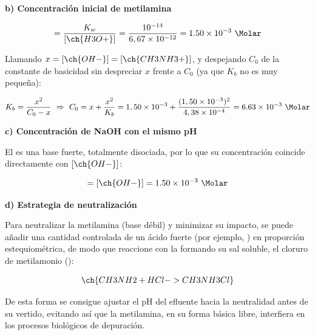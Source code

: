 \begin{exerciseEVAU}
\begin{solu}
    \textbf{b) Concentración inicial de metilamina}

    \begin{equation*}
        [\ch{OH-}] = \dfrac{K_w}{[\ch{H3O+}]} = \dfrac{10^{-14}}{6,67 \times 10^{-12}} = \num{1.50e-3} \ \si{\Molar}
    \end{equation*}

    Llamando \(x = [\ch{OH-}] = [\ch{CH3NH3+}]\), y despejando \(C_0\) de la constante de basicidad sin despreciar \(x\) frente a \(C_0\) (ya que \(K_b\) no es muy pequeña):

    \begin{equation*}
        K_b = \dfrac{x^2}{C_0-x} \ \Rightarrow \ C_0 = x + \dfrac{x^2}{K_b} = 1,50\times10^{-3} + \dfrac{(1,50\times10^{-3})^2}{4,38\times10^{-4}} = \num{6.63e-3} \ \si{\Molar}
    \end{equation*}

    \textbf{c) Concentración de NaOH con el mismo pH}

    El  es una base fuerte, totalmente disociada, por lo que su concentración coincide directamente con \([\ch{OH-}]\):

    \begin{equation*}
        [\ch{NaOH}] = [\ch{OH-}] = \num{1.50e-3} \ \si{\Molar}
    \end{equation*}

    \textbf{d) Estrategia de neutralización}

    Para neutralizar la metilamina (base débil) y minimizar su impacto, se puede añadir una cantidad controlada de un ácido fuerte (por ejemplo, ) en proporción estequiométrica, de modo que reaccione con la  formando su sal soluble, el cloruro de metilamonio ():

    \begin{equation*}
        \ch{CH3NH2 + HCl -> CH3NH3Cl}
    \end{equation*}

    De esta forma se consigue ajustar el pH del efluente hacia la neutralidad antes de su vertido, evitando así que la metilamina, en su forma básica libre, interfiera en los procesos biológicos de depuración.

\end{solu}

\end{exerciseEVAU}
